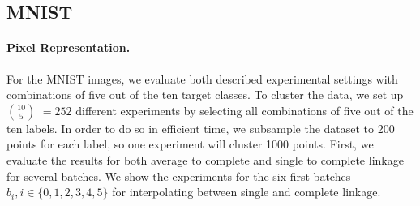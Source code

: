 \subsection{MNIST}

\paragraph{Pixel Representation.} For the MNIST images, we evaluate both described experimental settings with combinations of five out of the ten target classes. To cluster the data, we set up $10 \choose 5$ $= 252$ different experiments by selecting all combinations of five out of the ten labels. In order to do so in efficient time, we subsample the dataset to 200 points for each label, so one experiment will cluster 1000 points. First, we evaluate the results for both average to complete and single to complete linkage for several batches. We show the experiments for the six first batches $b_i, i \in \{0, 1, 2, 3, 4, 5\}$ for interpolating between single and complete linkage.

